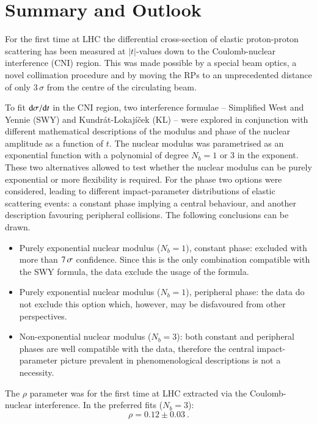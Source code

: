 \section{Summary and Outlook}
\label{sec:summary}
For the first time at LHC the differential cross-section of elastic proton-proton scattering has been measured at $|t|$-values down to the Coulomb-nuclear interference (CNI) region. This was made possible by a special beam optics, a novel collimation procedure and by moving the RPs to an unprecedented distance of only $3\,\sigma$ from the centre of the circulating beam.

To fit ${\rm d}\sigma/{\rm d} t$ in the CNI region, two interference formulae -- Simplified West and Yennie (SWY) and Kundr\' at-Lokaj\' i\v cek (KL) -- 
were explored in conjunction with different mathematical descriptions of the modulus and phase of the nuclear amplitude as a function of $t$. The nuclear modulus was parametrised as an exponential function with a polynomial of degree $N_b=1$ or $3$ in the exponent. These two alternatives allowed to test whether the nuclear modulus can be purely exponential or more flexibility is required. For the phase two options were considered, leading to different impact-parameter distributions of elastic scattering events: a constant phase implying a central behaviour, and another description favouring peripheral collisions. The following conclusions can be drawn.
\begin{itemize}
\item Purely exponential nuclear modulus ($N_b=1$), constant phase: excluded with more than $7\,{\rm \sigma}$ confidence. Since this is the only combination compatible with the SWY formula, the data exclude the usage of the formula.
\item Purely exponential nuclear modulus ($N_b=1$), peripheral phase: the data do not exclude this option which, however, may be disfavoured from other perspectives.
\item Non-exponential nuclear modulus ($N_b=3$): both constant and peripheral phases are well compatible with the data, therefore the central impact-parameter picture prevalent in phenomenological descriptions is not a necessity.
\end{itemize}

The $\rho$ parameter was for the first time at LHC extracted via the Coulomb-nuclear interference. In the preferred fits ($N_b=3$):
\begin{equation}
\label{eq:rho final}
\rho = 0.12 \pm 0.03\ .
\end{equation}

